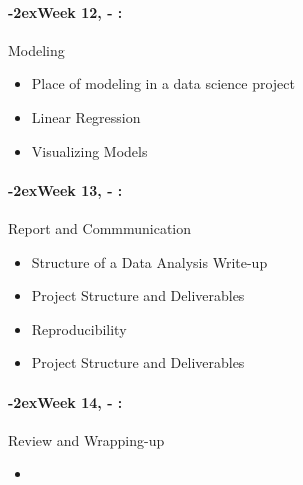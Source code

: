 \documentclass[11pt]{article}
\newcommand{\week}[1]{%
  \paragraph*{\kern-2ex\quad #1, \syldate{\today} - \AdvanceDate[4]\syldate{\today}:}%
  \ifdim\wd1=\wd\MONDAY
    \AdvanceDate[7]
  \else
    \AdvanceDate[7]
  \fi%
}
\begin{document}
\week{Week 12} Modeling
\begin{itemize}
\item Place of modeling in a data science project
\item Linear Regression
\item Visualizing Models
\end{itemize}

\week{Week 13} Report and Commmunication
\begin{itemize}
\item Structure of a Data Analysis Write-up
\item Project Structure and Deliverables
\item Reproducibility
\item Project Structure and Deliverables
\end{itemize}

\week{Week 14} Review and Wrapping-up
\begin{itemize}
\item 
\end{itemize}
\end{document}
